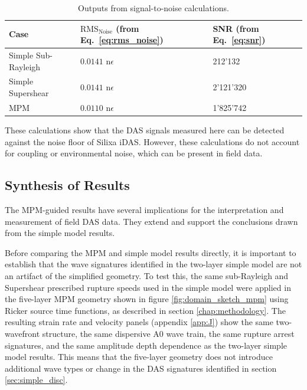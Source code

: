 \begin{table}[H]
\centering
\begin{tabular}{|l|l|l|}
\hline
\textbf{Case} & \textbf{$\text{RMS}_{\text{Noise}}$ (from Eq.~\ref{eq:rms_noise})} & \textbf{SNR (from Eq.~\ref{eq:snr})} \\ \hline
Simple Sub-Rayleigh & $0.0141\text{ n}\epsilon$ & 212'132 \\ \hline
Simple Supershear   & $0.0141\text{ n}\epsilon$ & 2'121'320 \\ \hline
MPM                 & $0.0110\text{ n}\epsilon$ & 1'825'742 \\ \hline
\end{tabular}
\caption{Outputs from signal-to-noise calculations.}
\label{tab:snr_output}
\end{table}

These calculations show that the DAS signals measured here can be detected against the noise floor of Silixa iDAS. However, these calculations do not account for coupling or environmental noise, which can be present in field data. \par

\subsection{Synthesis of Results}

The MPM-guided results have several implications for the interpretation and measurement of field DAS data. They extend and support the conclusions drawn from the simple model results. \par


Before comparing the MPM and simple model results directly, it is
important to establish that the wave signatures identified in the
two-layer simple model are not an artifact of the simplified geometry.
To test this, the same sub-Rayleigh and Supershear prescribed rupture
speeds used in the simple model were applied in the five-layer MPM
geometry  shown in figure \ref{fig:domain_sketch_mpm} using Ricker source time functions, as described in section \ref{chap:methodology}. The resulting strain rate and velocity panels (appendix \ref{app:J}) show the same two-wavefront structure, the same dispersive A0 wave train, the same rupture arrest signatures, and the same amplitude depth dependence as the two-layer simple model results. This means that the five-layer geometry does not introduce additional wave types or change in the DAS signatures
identified in section \ref{sec:simple_disc}. \par

